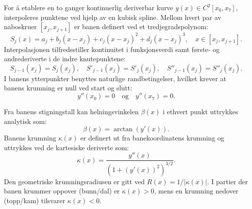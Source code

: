 \documentclass[11pt,a4paper]{article}
\begin{document}
For å etablere en to ganger kontinuerlig deriverbar kurve $y(x) \in C^2[x_0, x_7]$, interpoleres punktene ved hjelp av en kubisk spline. Mellom hvert par av naboskruer $[x_j, x_{j+1}]$ er banen definert ved et tredjegradspolynom:
\begin{equation}
    S_j(x) = a_j + b_j(x - x_j) + c_j(x - x_j)^2 + d_j(x - x_j)^3, \quad x \in [x_j, x_{j+1}].
    \label{eq:spline_def}
\end{equation}
Interpolasjonen tilfredsstiller kontinuitet i funksjonsverdi samt første- og andrederiverte i de indre knutepunktene:
\begin{equation}
    S_{j-1}(x_j) = S_j(x_j), \quad S'_{j-1}(x_j) = S'_j(x_j), \quad S''_{j-1}(x_j) = S''_j(x_j).
\end{equation}
I banens ytterpunkter benyttes naturlige randbetingelser, hvilket krever at banens krumning er null ved start og slutt:
\begin{equation}
    y''(x_0) = 0 \quad \text{og} \quad y''(x_7) = 0.
\end{equation}

Fra banens stigningstall kan helningsvinkelen $\beta(x)$ i ethvert punkt uttrykkes analytisk som:
\begin{equation}
    \beta(x) = \arctan\left(y'(x)\right).
    \label{eq:beta}
\end{equation}
Banens krumning $\kappa(x)$ er definert ut fra banekoordinatens krumning og uttrykkes ved de kartesiske deriverte som:
\begin{equation}
    \kappa(x) = \frac{y''(x)}{\left(1 + \left(y'(x)\right)^2\right)^{3/2}}.
    \label{eq:kappa}
\end{equation}
Den geometriske krumningsradiusen er gitt ved $R(x) = 1/|\kappa(x)|$. I partier der banen krummer oppover (bunn/dal) er $\kappa(x) > 0$, mens en krumning nedover (topp/kam) tilsvarer $\kappa(x) < 0$.
\end{document}
